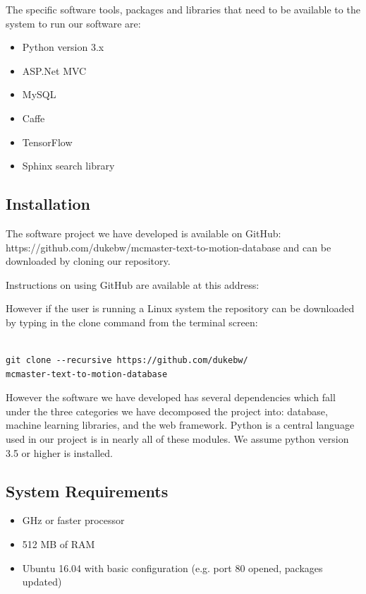 \documentclass{scrreprt}
\begin{document}
The specific software tools, packages and libraries that need to be available
to the system to run our software are:

\begin{itemize}
  \item Python version 3.x
  \item ASP.Net MVC
  \item MySQL
  \item Caffe
  \item TensorFlow
  \item Sphinx search library
\end{itemize}



\subsection{Installation}

The software project we have developed is available on GitHub:
https://github.com/dukebw/mcmaster-text-to-motion-database and can be
downloaded by cloning our repository.

Instructions on using GitHub are available at this address:

However if the user is running a Linux system the repository can be downloaded
by typing in the clone command from the terminal screen:

\begin{lstlisting}

git clone --recursive https://github.com/dukebw/
mcmaster-text-to-motion-database

\end{lstlisting}

However the software we have developed has several dependencies which fall
under the three categories we have decomposed the project into: database,
machine learning libraries, and the web framework.  Python is a central
language used in our project is in nearly all of these modules.  We assume
python version 3.5 or higher is installed.


\subsection{System Requirements}

\begin{itemize}
\item GHz or faster processor
\item 512 MB of RAM
\item Ubuntu 16.04 with basic configuration (e.g. port 80 opened, packages updated)
\end{itemize}
\end{document}
